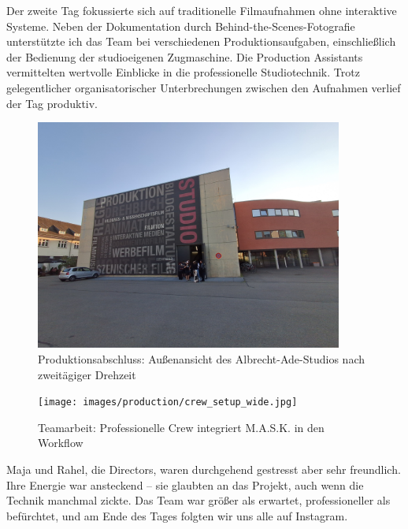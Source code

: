 Der zweite Tag fokussierte sich auf traditionelle Filmaufnahmen ohne interaktive Systeme. Neben der Dokumentation durch Behind-the-Scenes-Fotografie unterstützte ich das Team bei verschiedenen Produktionsaufgaben, einschließlich der Bedienung der studioeigenen Zugmaschine. Die Production Assistants vermittelten wertvolle Einblicke in die professionelle Studiotechnik. Trotz gelegentlicher organisatorischer Unterbrechungen zwischen den Aufnahmen verlief der Tag produktiv.

\begin{figure}[h]
   \centering
   \includegraphics[width=0.9\textwidth]{images/onSetImages/WideShotOfOutsideOfStudioAfter2DayShoot.jpg}
   \caption{Produktionsabschluss: Außenansicht des Albrecht-Ade-Studios nach zweitägiger Drehzeit}
   \label{fig:studio_exterior}
\end{figure}

\begin{figure}[h]
   \centering
   \texttt{[image: images/production/crew\_setup\_wide.jpg]}
   \caption{Teamarbeit: Professionelle Crew integriert M.A.S.K. in den Workflow}
   \label{fig:crew_setup}
\end{figure}

Maja und Rahel, die Directors, waren durchgehend gestresst aber sehr freundlich. Ihre Energie war ansteckend – sie glaubten an das Projekt, auch wenn die Technik manchmal zickte. Das Team war größer als erwartet, professioneller als befürchtet, und am Ende des Tages folgten wir uns alle auf Instagram.

